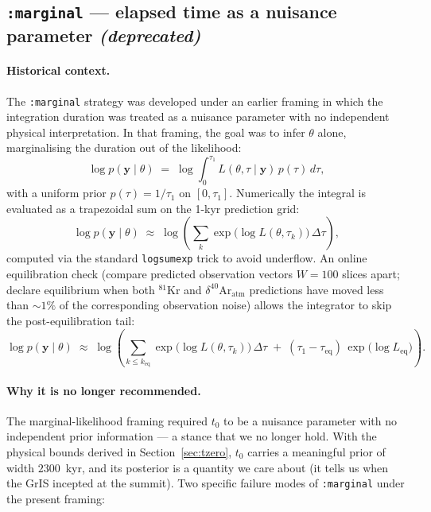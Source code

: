 \documentclass[11pt,a4paper]{article}
\newcommand{\Kr}{\ensuremath{{}^{81}\mathrm{Kr}}}
\newcommand{\Ar}{\ensuremath{\delta^{40}\mathrm{Ar}_{\mathrm{atm}}}}
\newcommand{\tzero}{\ensuremath{t_{0}}}
\newcommand{\code}[1]{\texttt{#1}}
\begin{document}
\subsection{\code{:marginal} --- elapsed time as a nuisance parameter \emph{(deprecated)}}
\label{sec:marginal}

\paragraph{Historical context.}
The \code{:marginal} strategy was developed under an earlier framing in
which the integration duration was treated as a nuisance parameter with no
independent physical interpretation. In that framing, the goal was to
infer $\theta$ alone, marginalising the duration out of the likelihood:
\begin{equation}
\log p(\mathbf{y} \mid \theta) \;=\; \log\!\int_{0}^{\tau_1}\!\! L(\theta, \tau \mid \mathbf{y})\,p(\tau)\,d\tau,
\label{eq:marginal-loglik}
\end{equation}
with a uniform prior $p(\tau) = 1/\tau_1$ on $[0, \tau_1]$. Numerically the
integral is evaluated as a trapezoidal sum on the 1-kyr prediction grid:
\begin{equation}
\log p(\mathbf{y} \mid \theta) \;\approx\; \log\!\left(\sum_{k}\exp\!\big(\log L(\theta, \tau_k)\big)\,\Delta \tau\right),
\label{eq:marginal-trapz}
\end{equation}
computed via the standard \code{logsumexp} trick to avoid underflow. An
online equilibration check (compare predicted observation vectors $W=100$
slices apart; declare equilibrium when both \Kr{} and \Ar{} predictions
have moved less than $\sim 1\%$ of the corresponding observation noise)
allows the integrator to skip the post-equilibration tail:
\begin{equation}
\log p(\mathbf{y} \mid \theta) \;\approx\; \log\!\left(\sum_{k \leq k_{\mathrm{eq}}}\!\exp\!\big(\log L(\theta, \tau_k)\big)\,\Delta \tau \;+\; (\tau_1 - \tau_{\mathrm{eq}})\,\exp\!\big(\log L_{\mathrm{eq}}\big)\right).
\label{eq:marginal-eq}
\end{equation}

\paragraph{Why it is no longer recommended.}
The marginal-likelihood framing required \tzero{} to be a nuisance
parameter with no independent prior information --- a stance that we no
longer hold. With the physical bounds derived in Section~\ref{sec:tzero},
\tzero{} carries a meaningful prior of width $2300$~kyr, and its posterior
is a quantity we care about (it tells us when the GrIS incepted at the
summit). Two specific failure modes of \code{:marginal} under the present
framing:
\end{document}
